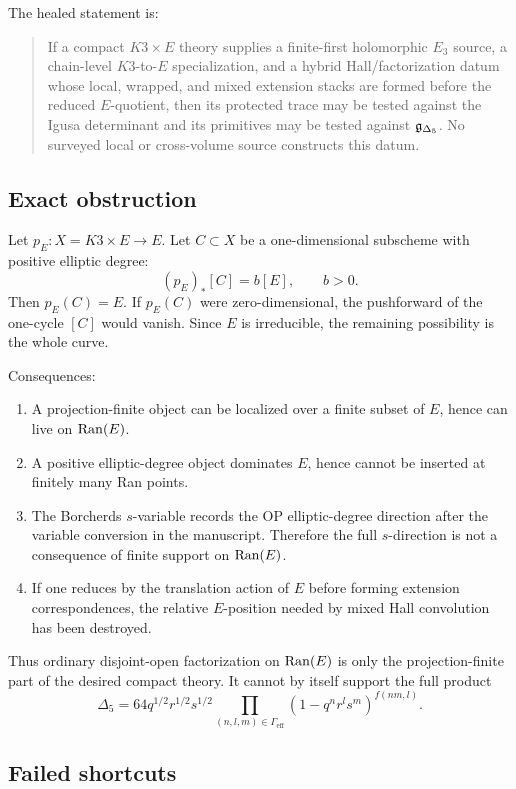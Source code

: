 The healed statement is:

\begin{quote}
If a compact \(K3\times E\) theory supplies a finite-first
holomorphic \(E_3\) source, a chain-level \(K3\)-to-\(E\)
specialization, and a hybrid Hall/factorization datum whose local,
wrapped, and mixed extension stacks are formed before the reduced
\(E\)-quotient, then its protected trace may be tested against the
Igusa determinant and its primitives may be tested against
\(\mathfrak g_{\Delta_5}\).  No surveyed local or cross-volume source constructs this
datum.
\end{quote}

\subsection{Exact obstruction}

Let \(p_E:X=K3\times E\to E\).  Let \(C\subset X\) be a
one-dimensional subscheme with positive elliptic degree:
\[
        (p_E)_*[C]=b[E],\qquad b>0.
\]
Then \(p_E(C)=E\).  If \(p_E(C)\) were zero-dimensional, the pushforward
of the one-cycle \([C]\) would vanish.  Since \(E\) is irreducible, the
remaining possibility is the whole curve.

Consequences:
\begin{enumerate}
\item A projection-finite object can be localized over a finite subset
of \(E\), hence can live on \(\operatorname{Ran}(E)\).
\item A positive elliptic-degree object dominates \(E\), hence cannot
be inserted at finitely many Ran points.
\item The Borcherds \(s\)-variable records the OP elliptic-degree
direction after the variable conversion in the manuscript.  Therefore
the full \(s\)-direction is not a consequence of finite support on
\(\operatorname{Ran}(E)\).
\item If one reduces by the translation action of \(E\) before forming
extension correspondences, the relative \(E\)-position needed by mixed
Hall convolution has been destroyed.
\end{enumerate}

Thus ordinary disjoint-open factorization on \(\operatorname{Ran}(E)\) is only the
projection-finite part of the desired compact theory.  It cannot by
itself support the full product
\[
\Delta_5
=64q^{1/2}r^{1/2}s^{1/2}
\prod_{(n,l,m)\in\Gamma_{\mathrm{eff}}}
(1-q^nr^ls^m)^{f(nm,l)}.
\]

\subsection{Failed shortcuts}

